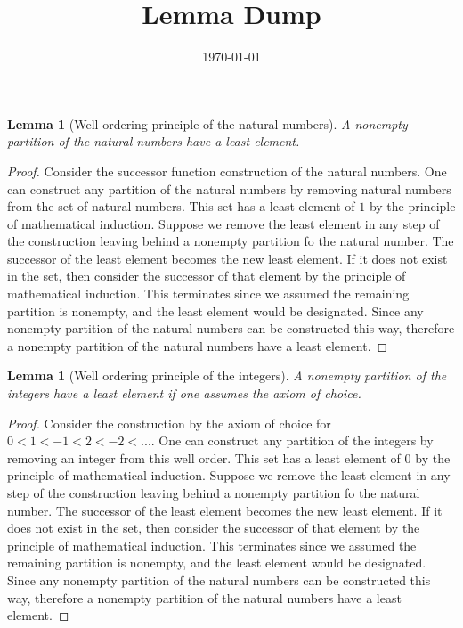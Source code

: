 \documentclass[10pt,twocolumn]{article}
\title{\textbf{Lemma Dump}}
\date{\today}
\newtheorem{lemma}[theorem]{Lemma}
\begin{document}

\begin{lemma}[Well ordering principle of the natural numbers]
    A nonempty partition of the natural numbers have a least element.
\end{lemma}

\begin{proof}
    Consider the successor function construction of the natural numbers.
    One can construct any partition of the natural numbers by removing natural numbers from the set of natural numbers.
    This set has a least element of $1$ by the principle of mathematical induction.
    Suppose we remove the least element in any step of the construction leaving behind a nonempty partition fo the natural number. 
    The successor of the least element becomes the new least element. If it does not exist in the set, then consider the successor of that element by the principle of mathematical induction. This terminates since we assumed the remaining partition is nonempty, and the least element would be designated. Since any nonempty partition of the natural numbers can be constructed this way, therefore a nonempty partition of the natural numbers have a least element.
\end{proof}

\begin{lemma}[Well ordering principle of the integers]
    A nonempty partition of the integers have a least element if one assumes the axiom of choice.
\end{lemma}

\begin{proof}
    Consider the construction by the axiom of choice for $0 < 1 < -1 < 2 < -2 < ...$.
    One can construct any partition of the integers by removing an integer from this well order.
    This set has a least element of $0$ by the principle of mathematical induction.
    Suppose we remove the least element in any step of the construction leaving behind a nonempty partition fo the natural number. 
    The successor of the least element becomes the new least element. If it does not exist in the set, then consider the successor of that element by the principle of mathematical induction. This terminates since we assumed the remaining partition is nonempty, and the least element would be designated. Since any nonempty partition of the natural numbers can be constructed this way, therefore a nonempty partition of the natural numbers have a least element.
\end{proof}
\end{document}
